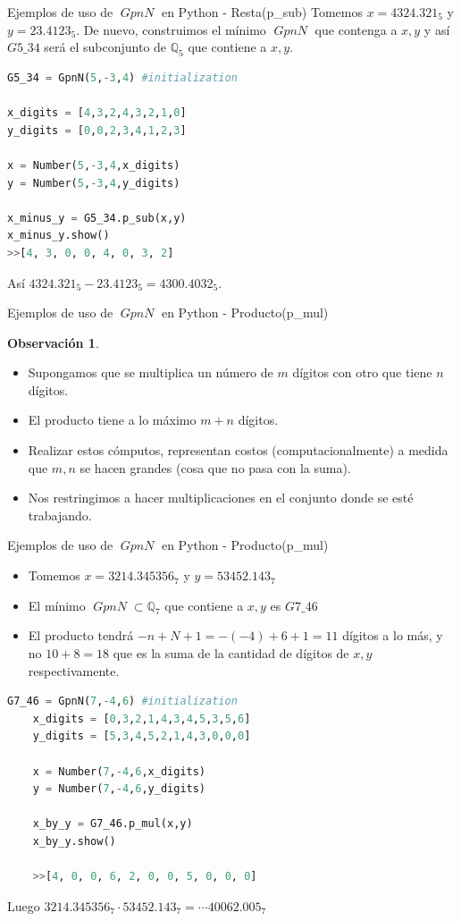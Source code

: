 \documentclass{beamer}
\theoremstyle{definition}
\numberwithin{equation}{section}
\newcommand{\redd}[1]{\textcolor{rkColor}{#1}}
\newtheorem{rr}{\redd{Observación}}
\newcommand{\Q}{\mathbb{Q}}
\DeclareMathOperator{\gpn}{\mathit{{GpnN}}}
\begin{document}
\begin{frame}[fragile]{Ejemplos de uso de $\gpn$ en Python - Resta(p\_sub) }
Tomemos ${x =4324.321_5}$ y ${y=23.4123_5}$. De nuevo, construimos el mínimo $\gpn$ que contenga a $x,y$ y así  $\mathit{G5\_{3}4}$ será el subconjunto de $\Q_5$ que contiene a $x,y$.
\begin{lstlisting}[language = Python, caption = resta de números en $\mathit{G5\_34}$,basicstyle=\tiny]
G5_34 = GpnN(5,-3,4) #initialization

x_digits = [4,3,2,4,3,2,1,0]
y_digits = [0,0,2,3,4,1,2,3]

x = Number(5,-3,4,x_digits)
y = Number(5,-3,4,y_digits)

x_minus_y = G5_34.p_sub(x,y)
x_minus_y.show()
>>[4, 3, 0, 0, 4, 0, 3, 2]

\end{lstlisting}
Así $ 4324.321_5-23.4123_5=4300.4032_5$.
\end{frame}


\begin{frame}[fragile]{Ejemplos de uso de $\gpn$ en Python - Producto(p\_mul) }
	\begin{rr}
	\label{producto}  
	\begin{itemize}
		\item  Supongamos que se multiplica un número de $m$  dígitos con otro que tiene $n$  dígitos.
		\item El producto tiene a lo máximo $m+n$ dígitos.
		\item Realizar estos cómputos, representan costos   (computacionalmente) a medida que $m,n$ se hacen grandes   (cosa que no pasa con la suma).
		\item Nos restringimos a hacer multiplicaciones en el conjunto donde se esté trabajando.
	\end{itemize}	
	\end{rr}
\end{frame}


\begin{frame}[fragile]{Ejemplos de uso de $\gpn$ en Python - Producto(p\_mul) }
	\begin{itemize}
		\item Tomemos $x=3214.345356_7$ y $y = 53452.143_7$
		\item El mínimo $\gpn\subset\Q_7$ que contiene a $x,y$ es $\mathit{G7\_{4}6}$
		\item El producto tendrá $-n+N+1=-   (-4)+6+1=11$ dígitos a lo más, y no $10+8=18$ que es la suma de la cantidad de dígitos de $x,y$ respectivamente.
	\end{itemize}
	\begin{lstlisting}[language = Python, caption = producto de números en $\mathit{G7\_46}$,basicstyle=\tiny]
	G7_46 = GpnN(7,-4,6) #initialization
	x_digits = [0,3,2,1,4,3,4,5,3,5,6]
	y_digits = [5,3,4,5,2,1,4,3,0,0,0]
	
	x = Number(7,-4,6,x_digits)
	y = Number(7,-4,6,y_digits)
	
	x_by_y = G7_46.p_mul(x,y)
	x_by_y.show()
	
	>>[4, 0, 0, 6, 2, 0, 0, 5, 0, 0, 0]
	\end{lstlisting}
	Luego $3214.345356_7\cdot 53452.143_7=\cdots40062.005_7$
\end{frame}
\end{document}
